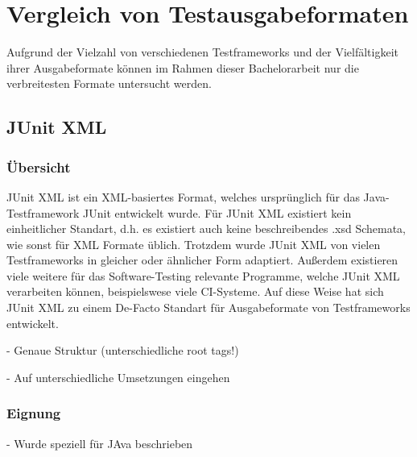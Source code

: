 
\chapter{Vergleich von Testausgabeformaten}\label{Vergleich Testausgabefomate}
Aufgrund der Vielzahl von verschiedenen Testframeworks und der Vielfältigkeit ihrer Ausgabeformate können im Rahmen dieser Bachelorarbeit nur die verbreitesten Formate untersucht werden.



\section{JUnit XML}\label{JUNIT}
\subsection{Übersicht}
JUnit XML ist ein XML-basiertes Format, welches ursprünglich für das Java-Testframework JUnit entwickelt wurde. Für JUnit XML existiert kein einheitlicher Standart, d.h. es existiert auch keine beschreibendes .xsd Schemata, wie sonst für XML Formate üblich. Trotzdem wurde JUnit XML von vielen Testframeworks in gleicher oder ähnlicher Form adaptiert. Außerdem existieren viele weitere für das Software-Testing relevante Programme, welche JUnit XML verarbeiten können, beispielswese viele CI-Systeme. Auf diese Weise hat sich JUnit XML zu einem De-Facto Standart für Ausgabeformate von Testframeworks entwickelt.


- Genaue Struktur (unterschiedliche root tags!)

- Auf unterschiedliche Umsetzungen eingehen


\subsection{Eignung}
- Wurde speziell für JAva beschrieben



